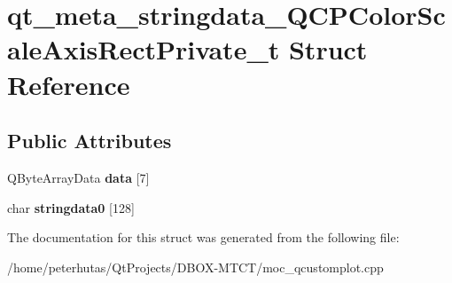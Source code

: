 \hypertarget{structqt__meta__stringdata___q_c_p_color_scale_axis_rect_private__t}{}\section{qt\+\_\+meta\+\_\+stringdata\+\_\+\+Q\+C\+P\+Color\+Scale\+Axis\+Rect\+Private\+\_\+t Struct Reference}
\label{structqt__meta__stringdata___q_c_p_color_scale_axis_rect_private__t}
\subsection*{Public Attributes}
\begin{DoxyCompactItemize}
\item 
\mbox{\label{structqt__meta__stringdata___q_c_p_color_scale_axis_rect_private__t_ad6a4e6859b02e86ad4cab1b35d1a9e24}} 
Q\+Byte\+Array\+Data {\bfseries data} \mbox{[}7\mbox{]}
\item 
\mbox{\label{structqt__meta__stringdata___q_c_p_color_scale_axis_rect_private__t_ab4bf0dacc0cccfabffae8da79f9f5f46}} 
char {\bfseries stringdata0} \mbox{[}128\mbox{]}
\end{DoxyCompactItemize}


The documentation for this struct was generated from the following file\+:\begin{DoxyCompactItemize}
\item 
/home/peterhutas/\+Qt\+Projects/\+D\+B\+O\+X-\/\+M\+T\+C\+T/moc\+\_\+qcustomplot.\+cpp\end{DoxyCompactItemize}
